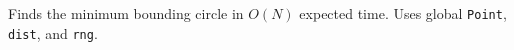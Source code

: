 
Finds the minimum bounding circle in $O(N)$ expected time. Uses global \lstinline|Point|, \lstinline|dist|, and \lstinline|rng|.


